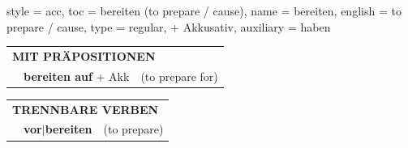 \begin{verbentry}{
  style = {acc},
  toc = {bereiten (to prepare / cause)},
  name = {bereiten},
  english = {to prepare / cause},
  type = {regular, + Akkusativ},
  auxiliary = {haben}
}
\vspace{10pt}

\begin{tabular}{lll}
\multicolumn{3}{l}{\textbf{MIT PRÄPOSITIONEN}}\\
& \textbf{bereiten auf} + Akk & (to prepare for)\\
\end{tabular}
\hfill
\begin{tabular}{lll}
\multicolumn{3}{l}{\textbf{TRENNBARE VERBEN}}\\
& \textbf{vor$|$bereiten} & (to prepare)\\
\end{tabular}

\vspace{-5pt}
\end{verbentry}

